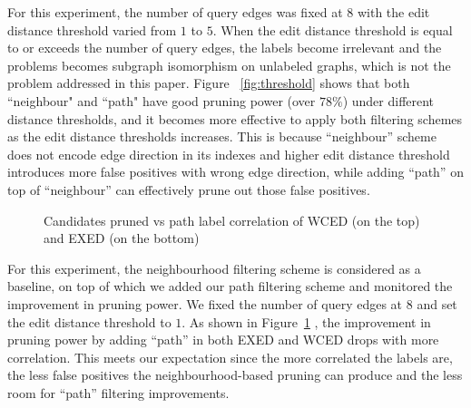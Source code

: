 \documentclass{sigmod}
\begin{document}
 For this experiment, the number of query edges was fixed at $8$ with the edit distance threshold varied from $1$ to $5$. When the edit distance threshold is equal to or exceeds the number of query edges, the labels become irrelevant and the problems becomes subgraph isomorphism on unlabeled graphs, which is not the problem addressed in this paper. Figure ~\ref{fig:threshold} shows that both ``neighbour" and ``path" have good pruning power (over $78\%$) under different distance thresholds, and it becomes more effective to apply both filtering schemes as the edit distance thresholds increases. This is because ``neighbour'' scheme does not encode edge direction in its indexes and higher edit distance threshold introduces more false positives with wrong edge direction, while adding ``path'' on top of ``neighbour'' can effectively prune out those false positives.
\begin{figure}[htb]
\setlength{\belowcaptionskip}{-1\baselineskip}
\centering
{}
\vspace{-2\baselineskip}

\vspace{-2\baselineskip}
\caption{Candidates pruned vs path label correlation of WCED (on the top) and EXED (on the bottom)}
\label{fig:labelcor}
\end{figure}


 For this experiment, the neighbourhood filtering scheme is considered as a baseline, on top of which we added our path filtering scheme and monitored the improvement in pruning power. We fixed  the number of query edges at $8$ and set the edit distance threshold to $1$. As shown in Figure~\ref{fig:labelcor} , the improvement in pruning power by adding ``path'' in both EXED and WCED drops with more correlation. This meets our expectation since the more correlated the labels are, the less false positives the neighbourhood-based pruning can produce and the less room for ``path'' filtering improvements.
\end{document}
